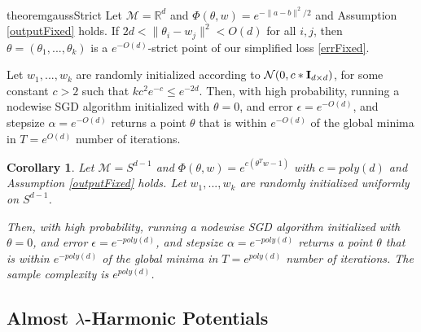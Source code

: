 \documentclass{article}
\newtheorem{corollary}[theorem]{Corollary}
\newcommand{\N}{{\mathbb{N}}}
\newcommand{\R}{{\mathbb{R}}}
\begin{document}

\begin{restatable}{theorem}{gaussStrict}
\label{GaussStrict}
Let $\mathcal{M} = \R^d$ and $\Phi(\theta,w) = e^{-\|a-b\|^2/2}$ and Assumption \ref{outputFixed} holds. If $2d < \|\theta_i - w_j\|^2 < O(d)$ for all $i, j$, then $\theta = (\theta_1,...,\theta_k)$ is a $e^{-O(d)}$-strict point of our simplified loss \eqref{errFixed}.

Let $w_1,...,w_k$ are randomly initialized according to $\mathcal{N}(0, c*{\bf I}_{d\times d})$, for some constant $c > 2$ such that $kc^2e^{-c} \leq e^{-2d}$. Then, with high probability, running a nodewise SGD algorithm initialized with $\theta = 0$, and error  $\epsilon = e^{-O(d)}$, and stepsize $\alpha = e^{-O(d)}$ returns a point $\theta$ that is within $e^{-O(d)}$ of the global minima in $T = e^{O(d)}$ number of iterations.

\end{restatable}

\begin{corollary}
Let $\mathcal{M} =  S^{d-1}$ and $\Phi(\theta,w) = e^{c(\theta^Tw-1)}$ with $c = poly(d)$ and Assumption \ref{outputFixed} holds. Let $w_1,...,w_k$ are randomly initialized uniformly on $S^{d-1}$. 

Then, with high probability, running a nodewise SGD algorithm initialized with $\theta = 0$, and error  $\epsilon = e^{-poly(d)}$, and stepsize $\alpha = e^{-poly(d)}$ returns a point $\theta$ that is within $e^{-poly(d)}$ of the global minima in $T = e^{poly(d)}$ number of iterations. The sample complexity is $e^{poly(d)}$. 
\end{corollary}

\subsection{Almost $\lambda$-Harmonic Potentials}
\end{document}
